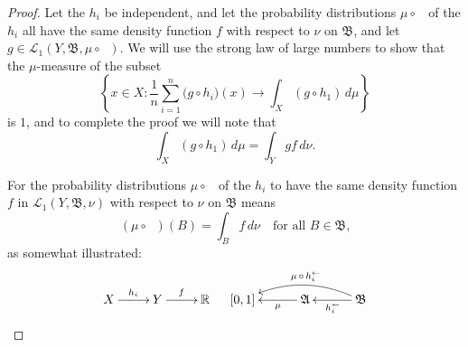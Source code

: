 \documentclass[
twoside=true,
paper=letter,
fontsize=9pt,
pagesize=auto,
leqno,
openany,
headsepline,
overfullrule,
]{scrbook}
\theoremstyle{plain}
\theoremstyle{plain}
\theoremstyle{definition}
\theoremstyle{bfnoteitalic}
\theoremstyle{bfnoteroman}
\newcommand{\sigalg}[1]{\mathfrak{#1}}
\newcommand{\cali}[1]{\mathscr{#1}}
\newcommand{\preimage}[1]{\mathop{#1^{\leftarrow}}}
\newcommand{\R}{\mathbb{R}}
\newcommand{\sigmaalgebra}{\sigalg{A}}
\newcommand{\sigmaalgebraii}{\sigalg{B}}
\newcommand{\funcf}{f}
\newcommand{\funcg}{g}
\newcommand{\funch}{h}
\newcommand{\function}{f}
\newcommand{\measurespace}{X}
\newcommand{\measurespaceii}{Y}
\newcommand{\mspaceelt}{x}
\newcommand{\measure}{\mu}
\newcommand{\measmu}{\mu}
\newcommand{\measnu}{\nu}
\newcommand{\setii}{B}
\begin{document}
\begin{proof}
Let the $\funch_i$ be independent, and let the probability distributions 
$\measure\circ\preimage{\funch_i}$
of the $\funch_i$ all have the same density function $\function$ with respect to 
$\measnu$ on $\sigmaalgebraii$, and let 
$\funcg\in
\cali{L}_1(\measurespaceii,\sigmaalgebraii,\measmu\circ\preimage{\funch_i})$.
We will use the strong law of large numbers to show that the $\measure$-measure of the subset
\[
\left\{ 
\mspaceelt\in\measurespace : 
\frac{1}{n} \sum_{i=1}^n \bigl( \funcg \circ \funch_i \bigr) (x) \to
\int_\measurespace (\funcg \circ \funch_1) \,d\measure 
\right\}
\]
is $1$, and to complete the proof we will note that
\[
\int_\measurespace (\funcg \circ \funch_1) \,d\measure
=
\int_\measurespaceii \funcg \funcf \,d\measnu.
\]


For the probability distributions 
$\measure\circ\preimage{\funch_i}$
of the $\funch_i$ to have the same density function 
$\funcf$ in $\cali{L}_1(\measurespaceii,\sigmaalgebraii,\measnu)$ 
with respect to  $\measnu$ on $\sigmaalgebraii$ means
\[
(\measmu\circ\preimage{\funch_i})(\setii)
=
\int_\setii \funcf\, d\measnu
\quad\text{for all $\setii\in\sigmaalgebraii$,}
\]
as somewhat illustrated:
\[
\xymatrix@R=18pt{
\measurespace \ar[r]^{\funch_i} 
& \measurespaceii \ar[r]^{\funcf} 
& \R \\
}
\quad
\xymatrix@R=18pt@C=30pt{
[0,1]
& \sigmaalgebra 
\ar[l]^-\measmu
& \sigmaalgebraii
\ar[l]^{\preimage{\funch_i}} 
\ar@/_12pt/[ll]_-{\measmu\,\circ\,\preimage{\funch_i}}
}
\]


\end{proof}
\end{document}
